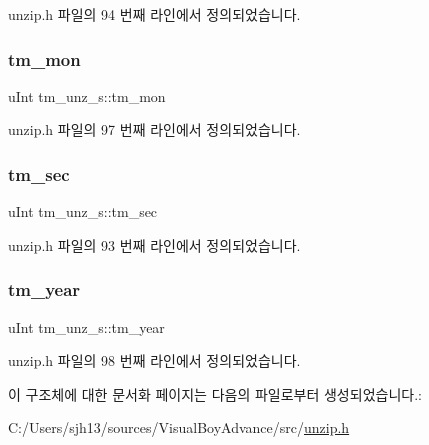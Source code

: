 unzip.\+h 파일의 94 번째 라인에서 정의되었습니다.

\mbox{\label{structtm__unz__s_a4f5e461d8cad18d1aff7ec012168111d}} 
\subsubsection{\texorpdfstring{tm\+\_\+mon}{tm\_mon}}
{\footnotesize\ttfamily u\+Int tm\+\_\+unz\+\_\+s\+::tm\+\_\+mon}



unzip.\+h 파일의 97 번째 라인에서 정의되었습니다.

\mbox{\label{structtm__unz__s_ab91e69a9869e5db5be51b1aebaa5ea0d}} 
\subsubsection{\texorpdfstring{tm\+\_\+sec}{tm\_sec}}
{\footnotesize\ttfamily u\+Int tm\+\_\+unz\+\_\+s\+::tm\+\_\+sec}



unzip.\+h 파일의 93 번째 라인에서 정의되었습니다.

\mbox{\label{structtm__unz__s_a5f17147e3cfbbfdbeb2e29cbc1df8136}} 
\subsubsection{\texorpdfstring{tm\+\_\+year}{tm\_year}}
{\footnotesize\ttfamily u\+Int tm\+\_\+unz\+\_\+s\+::tm\+\_\+year}



unzip.\+h 파일의 98 번째 라인에서 정의되었습니다.



이 구조체에 대한 문서화 페이지는 다음의 파일로부터 생성되었습니다.\+:\begin{DoxyCompactItemize}
\item 
C\+:/\+Users/sjh13/sources/\+Visual\+Boy\+Advance/src/\mbox{\hyperlink{unzip_8h}{unzip.\+h}}\end{DoxyCompactItemize}
